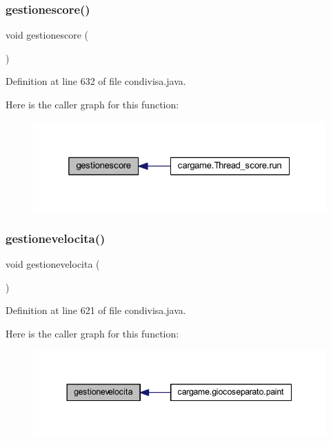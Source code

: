 \subsubsection{\texorpdfstring{gestionescore()}{gestionescore()}}
{\footnotesize\ttfamily void gestionescore (\begin{DoxyParamCaption}{ }\end{DoxyParamCaption})}



Definition at line 632 of file condivisa.\+java.

Here is the caller graph for this function\+:
\nopagebreak
\begin{figure}[H]
\begin{center}
\leavevmode
\includegraphics[width=325pt]{classcargame_1_1condivisa_aff555bd79e80391637df4bbe885ff837_icgraph}
\end{center}
\end{figure}
\mbox{\label{classcargame_1_1condivisa_abadc979a444724e04bdd60433875b774}} 
\subsubsection{\texorpdfstring{gestionevelocita()}{gestionevelocita()}}
{\footnotesize\ttfamily void gestionevelocita (\begin{DoxyParamCaption}{ }\end{DoxyParamCaption})}



Definition at line 621 of file condivisa.\+java.

Here is the caller graph for this function\+:
\nopagebreak
\begin{figure}[H]
\begin{center}
\leavevmode
\includegraphics[width=344pt]{classcargame_1_1condivisa_abadc979a444724e04bdd60433875b774_icgraph}
\end{center}
\end{figure}
\mbox{\label{classcargame_1_1condivisa_a1a0fa95c76119cc26dfcbba5c30066fa}} 
